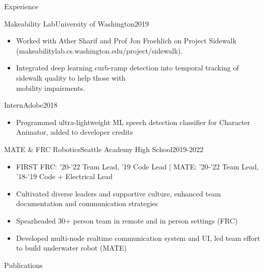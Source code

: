 \documentclass[]{mcdowellcv}
\begin{document}
\begin{cvsection}{Experience}
	\begin{cvsubsection}{Makeability Lab}{University of Washington}{2019}
		\begin{itemize}
			\item Worked with Ather Sharif and Prof Jon Froehlich on Project Sidewalk (makeabilitylab.cs.washington.edu/project/sidewalk).
			\item Integrated deep learning curb-ramp detection into temporal tracking of sidewalk quality to help those with \\ mobility impairments. \cite{SharifGSBFWDF21}
		\end{itemize}
	\end{cvsubsection}

	\begin{cvsubsection}{Intern}{Adobe}{2018}
		\begin{itemize}
			\item Programmed ultra-lightweight ML speech detection classifier for Character Animator, added to developer credits
		\end{itemize}
	\end{cvsubsection}

	\begin{cvsubsection}{MATE \& FRC Robotics}{Seattle Academy High School}{2019-2022}
		\begin{itemize}
			\item FIRST FRC:  '20-'22 Team Lead,  '19 Code Lead | MATE: '20-'22 Team Lead, '18-'19 Code + Electrical Lead
			\item Cultivated diverse leaders and supportive culture, enhanced team documentation and communication strategies
			\item Spearheaded 30+ person team in remote and in person settings (FRC)
			\item Developed multi-node realtime communication system and UI, led team effort to build underwater robot (MATE)
		\end{itemize}
	\end{cvsubsection}

\end{cvsection}

\begin{cvsection}{Publications}
\nocite{*}
	\printbibliography[heading=none]
\end{cvsection}
\end{document}
